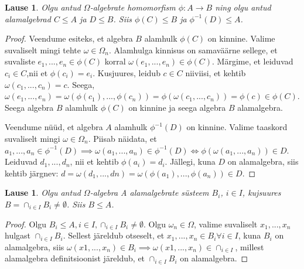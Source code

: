 \documentclass[12pt]{report}
\numberwithin{equation}{section}
\theoremstyle{definition}
\theoremstyle{plain}
\newtheorem{homomorfism_ja_alamalgebrad}[equation]{Lause}
\newtheorem{alamalgebrate_systeemi_yhisosa_alamalgebra}[equation]{Lause}
\begin{document}
\begin{homomorfism_ja_alamalgebrad}
Olgu antud $\Omega$-algebrate homomorfism $\phi : A \to B$ ning olgu antud alamalgebrad $C \leq A$ ja $D \leq B$. Siis $\phi(C) \leq B$ ja $\phi^{-1}(D) \leq A$. 
\end{homomorfism_ja_alamalgebrad}

\begin{proof}
Veendume esiteks, et algebra $B$ alamhulk $\phi(C)$ on kinnine. Valime suvaliselt mingi  tehte $\omega \in \Omega_n$. Alamhulga kinnisus on samaväärne sellege, et suvaliste $ e_1,...,e_n \in \phi(C)$ korral $\omega(e_1,...,e_n) \in \phi(C)$. Märgime, et leiduvad $ c_i \in C$,nii et $\phi(c_i)=e_i$. Kusjuures, leidub $ c \in C$ niiviisi, et kehtib $ \omega(c_1,...,c_n) = c$. Seega, $ \omega(e_1,...,e_n) = \omega(\phi(c_1),...,\phi(c_n))= \phi(\omega(c_1,...,c_n)) = \phi(c) \in \phi(C)$. Seega algebra $B$ alamhulk $\phi(C)$ on kinnine ja seega algebra $B$ alamalgebra. 

Veendume n\"u\"ud, et algebra $A$ alamhulk $\phi^{-1}(D)$ on kinnine. Valime taaskord suvaliselt mingi $\omega \in \Omega_n$. Piisab näidata, et $a_1,...,a_n \in \phi^{-1}(D) \implies \omega(a_1,...,a_n) \in \phi^{-1}(D) \iff \phi(\omega(a_1,...,a_n)) \in D$. Leiduvad $d_1,...,d_n$, nii et kehtib $\phi(a_i)=d_i$. Jällegi, kuna $D$ on alamalgebra, siis kehtib järgnev: $d = \omega(d_1,...,dn) = \omega(\phi(a_1),...,\phi(a_n)) \in D$.
 


\end{proof}
 
 

\begin{alamalgebrate_systeemi_yhisosa_alamalgebra} Olgu antud $\Omega$-algebra A alamalgebrate s\"usteem $B_i$, $i \in I$, kujsuures $B= \cap_{i \in I} B_i \neq \emptyset$. Siis $B \leq A$.
\end{alamalgebrate_systeemi_yhisosa_alamalgebra}

\begin{proof}
Olgu $B_i \leq A, i \in I, \cap_{i \in I}B_i \neq \emptyset$. Olgu $\omega_n \in \Omega$, valime suvaliselt $x_1,...,x_n$ hulgast $\cap_{i \in I} B_i$. Sellest järeldub otseselt, et $x_1,...,x_n \in B_i \forall i \in I$, kuna $B_i$ on alamalgebra, siis $\omega(x1,...,x_n) \in B_i \implies \omega(x1,...,x_n) \in \cap_{i \in I}$, millest alamalgebra definitsioonist järeldub, et $\cap_{i \in I} B_i$ on alamalgebra.
\end{proof}
\end{document}
